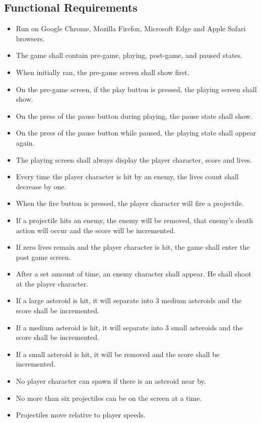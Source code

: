 \documentclass[12pt, titlepage]{article}
\begin{document}
\subsection{Functional Requirements}
  \begin{itemize}
    \item Run on Google Chrome, Mozilla Firefox, Microsoft Edge and Apple Safari browsers.
    \item The game shall contain pre-game, playing, post-game, and paused states.
    \item When initially ran, the pre-game screen shall show first.
    \item On the pre-game screen, if the play button is pressed, the playing screen shall show.
    \item On the press of the pause button during playing, the pause state shall show.
    \item On the press of the pause button while paused, the playing state shall appear again.
    \item The playing screen shall always display the player character, score and lives.
    \item Every time the player character is hit by an enemy, the lives count shall decrease by one.
    \item When the fire button is pressed, the player character will fire a projectile.
    \item If a projectile hits an enemy, the enemy will be removed, that enemy's death action will occur and the score will be incremented.
    \item If zero lives remain and the player character is hit, the game shall enter the post game screen.
    \item After a set amount of time, an enemy character shall appear. He shall shoot at the player character.
    \item If a large asteroid is hit, it will separate into 3 medium asteroids and the score shall be incremented.
    \item If a medium asteroid is hit, it will separate into 3 small asteroids and the score shall be incremented.
    \item If a small asteroid is hit, it will be removed and the score shall be incremented.
    \item No player character can spawn if there is an asteroid near by.
    \item No more than six projectiles can be on the screen at a time.
    \item Projectiles move relative to player speeds.
  \end{itemize}
\end{document}
